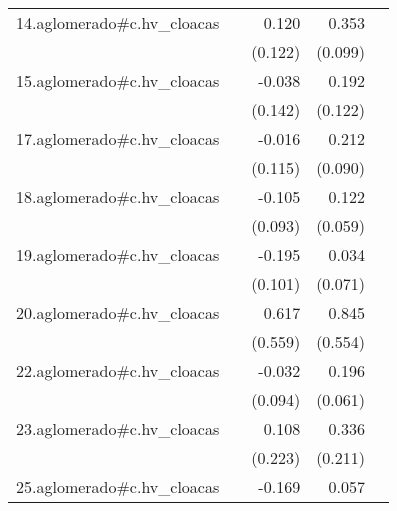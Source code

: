 {\begin{longtable}{l*{4}{D{.}{.}{-1}}}
\addlinespace
14.aglomerado#c.hv\_cloacas&                     &       0.120         &       0.353\sym{***}&                     \\
            &                     &     (0.122)         &     (0.099)         &                     \\
\addlinespace
15.aglomerado#c.hv\_cloacas&                     &      -0.038         &       0.192         &                     \\
            &                     &     (0.142)         &     (0.122)         &                     \\
\addlinespace
17.aglomerado#c.hv\_cloacas&                     &      -0.016         &       0.212\sym{*}  &                     \\
            &                     &     (0.115)         &     (0.090)         &                     \\
\addlinespace
18.aglomerado#c.hv\_cloacas&                     &      -0.105         &       0.122\sym{*}  &                     \\
            &                     &     (0.093)         &     (0.059)         &                     \\
\addlinespace
19.aglomerado#c.hv\_cloacas&                     &      -0.195         &       0.034         &                     \\
            &                     &     (0.101)         &     (0.071)         &                     \\
\addlinespace
20.aglomerado#c.hv\_cloacas&                     &       0.617         &       0.845         &                     \\
            &                     &     (0.559)         &     (0.554)         &                     \\
\addlinespace
22.aglomerado#c.hv\_cloacas&                     &      -0.032         &       0.196\sym{**} &                     \\
            &                     &     (0.094)         &     (0.061)         &                     \\
\addlinespace
23.aglomerado#c.hv\_cloacas&                     &       0.108         &       0.336         &                     \\
            &                     &     (0.223)         &     (0.211)         &                     \\
\addlinespace
25.aglomerado#c.hv\_cloacas&                     &      -0.169         &       0.057         &                     \\

\end{longtable}}
